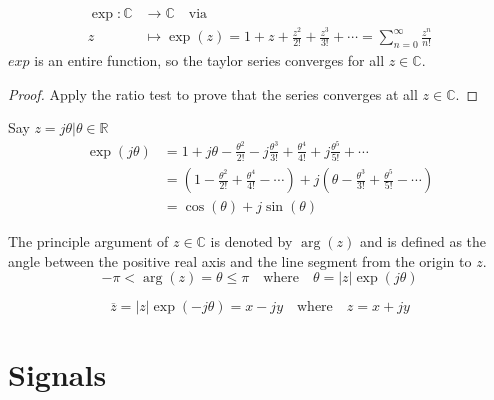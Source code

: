 \begin{definition}
    \begin{align*}
        \exp : \mathbb{C} & \to \mathbb{C} \quad \text{via}                                                                         \\
        z                 & \mapsto \exp(z) = 1 + z + \frac{z^2}{2!} + \frac{z^3}{3!} + \cdots = \sum_{n=0}^{\infty} \frac{z^n}{n!}
    \end{align*}
    $exp$ is an entire function, so the taylor series converges for all $z \in \mathbb{C}$.
\end{definition}
\begin{proof}
    Apply the ratio test to prove that the series converges at all $z \in \mathbb{C}$.
\end{proof}

\begin{example}
    Say $z = j\theta | \theta \in \mathbb{R}$
    \begin{align*}
        \exp(j\theta) & = 1 + j\theta - \frac{\theta^2}{2!} - j\frac{\theta^3}{3!} + \frac{\theta^4}{4!} + j\frac{\theta^5}{5!} + \cdots            \\
                      & = (1 - \frac{\theta^2}{2!} + \frac{\theta^4}{4!} - \cdots) + j(\theta - \frac{\theta^3}{3!} + \frac{\theta^5}{5!} - \cdots) \\
                      & = \cos(\theta) + j\sin(\theta)
    \end{align*}

\end{example}

\begin{definition}
    The principle argument of $z \in \mathbb{C}$ is denoted by $\arg(z)$ and is defined as the angle between the positive real axis and the line segment from the origin to $z$.
    \[
        -\pi < \arg(z) = \theta \leq \pi \quad \text{where} \quad \theta = |z| \exp(j\theta)
    \]
\end{definition}

\begin{definition}
    \[
        \overline{z} = |z| \exp(-j\theta) = x - jy \quad \text{where} \quad z = x + jy
    \]
\end{definition}

\section{Signals}
